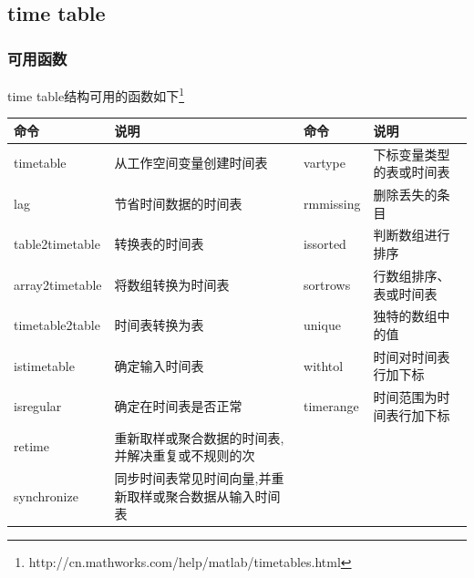     \subsection{time table}
        \subsubsection{可用函数}
            time table结构可用的函数如下\footnote{http://cn.mathworks.com/help/matlab/timetables.html}
            \begin{table}[H]
            \centering
            \begin{tabularx}{\textwidth}{lXlX}
            \toprule
            命令& 说明&命令& 说明\\
            \midrule
            timetable & 从工作空间变量创建时间表&vartype  & 下标变量类型的表或时间表\\
            lag  & 节省时间数据的时间表&rmmissing  & 删除丢失的条目\\
            table2timetable  & 转换表的时间表&issorted  &判断数组进行排序\\
            array2timetable  & 将数组转换为时间表&sortrows & 行数组排序、表或时间表\\
            timetable2table  & 时间表转换为表&unique & 独特的数组中的值\\
            istimetable  & 确定输入时间表&withtol &  时间对时间表行加下标\\
            isregular  & 确定在时间表是否正常&timerange &  时间范围为时间表行加下标\\
            retime & 重新取样或聚合数据的时间表,并解决重复或不规则的次&{}&{}\\
            synchronize &  同步时间表常见时间向量,并重新取样或聚合数据从输入时间表&{}&{}\\
            \bottomrule
            \end{tabularx}
            \end{table}

